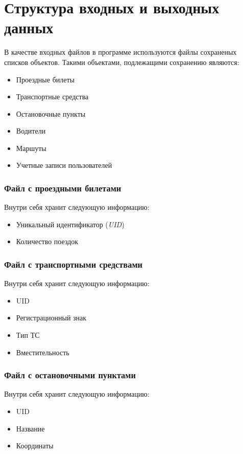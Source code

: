 \section{Структура входных и выходных данных}
В качестве входных файлов в программе используются файлы сохраненых списков объектов. Такими объектами, подлежащими сохранению являются:
\begin{itemize}
    \item Проездные билеты
    \item Транспортные средства
    \item Остановочные пункты
    \item Водители
    \item Маршуты
    \item Учетные записи пользователей
\end{itemize}

\subsubsection{Файл с проездными билетами}
Внутри себя хранит следующую информацию:
\begin{itemize}
    \item Уникальный идентификатор (\textit{UID}) 
    \item Количество поездок
\end{itemize}

\subsubsection{Файл с транспортными средствами}
Внутри себя хранит следующую информацию:
\begin{itemize}
    \item UID
    \item Регистрационный знак
    \item Тип ТС
    \item Вместительность
\end{itemize}

\subsubsection{Файл с остановочными пунктами}
Внутри себя хранит следующую информацию:
\begin{itemize}
    \item UID
    \item Название
    \item Координаты
\end{itemize}


